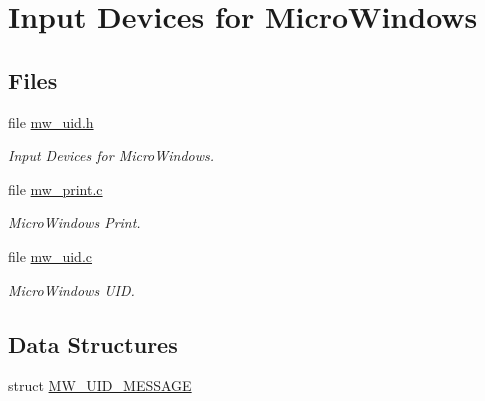 \hypertarget{group__libmisc__fb__mw}{}\section{Input Devices for Micro\+Windows}
\label{group__libmisc__fb__mw}
\subsection*{Files}
\begin{DoxyCompactItemize}
\item 
file \mbox{\hyperlink{mw__uid_8h}{mw\+\_\+uid.\+h}}
\begin{DoxyCompactList}\small\item\em Input Devices for Micro\+Windows. \end{DoxyCompactList}\item 
file \mbox{\hyperlink{mw__print_8c}{mw\+\_\+print.\+c}}
\begin{DoxyCompactList}\small\item\em Micro\+Windows Print. \end{DoxyCompactList}\item 
file \mbox{\hyperlink{mw__uid_8c}{mw\+\_\+uid.\+c}}
\begin{DoxyCompactList}\small\item\em Micro\+Windows U\+ID. \end{DoxyCompactList}\end{DoxyCompactItemize}
\subsection*{Data Structures}
\begin{DoxyCompactItemize}
\item 
struct \mbox{\hyperlink{structMW__UID__MESSAGE}{M\+W\+\_\+\+U\+I\+D\+\_\+\+M\+E\+S\+S\+A\+GE}}
\end{DoxyCompactItemize}
